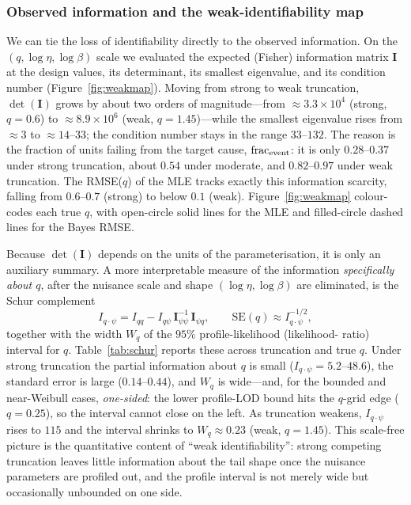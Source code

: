 \documentclass[ASNA,twocolumn]{USG}
\begin{document}
\subsubsection{Observed information and the weak-identifiability map}\label{sec:info}
We can tie the loss of identifiability directly to the observed
information. On the $(q,\log\eta,\log\beta)$ scale we evaluated the
expected (Fisher) information matrix $\bm I$ at the design values, its
determinant, its smallest eigenvalue, and its condition number
(Figure~\ref{fig:weakmap}). Moving from strong to weak truncation,
$\det(\bm I)$ grows by about two orders of magnitude---from
$\approx3.3\times10^{4}$ (strong, $q=0.6$) to $\approx8.9\times10^{6}$
(weak, $q=1.45$)---while the smallest eigenvalue rises from $\approx3$ to
$\approx14$--$33$; the condition number stays in the range
$33$--$132$. The reason is the fraction of units failing from the target
cause, $\mathrm{frac}_{\rm event}$: it is only $0.28$--$0.37$ under strong
truncation, about $0.54$ under moderate, and $0.82$--$0.97$ under weak
truncation. The RMSE($q$) of the MLE tracks exactly this information
scarcity, falling from $0.6$--$0.7$ (strong) to below $0.1$ (weak).
Figure~\ref{fig:weakmap} colour-codes each true $q$, with open-circle solid
lines for the MLE and filled-circle dashed lines for the Bayes RMSE.

Because $\det(\bm I)$ depends on the units of the parameterisation, it is
only an auxiliary summary. A more interpretable measure of the information
\emph{specifically about $q$}, after the nuisance scale and shape
$(\log\eta,\log\beta)$ are eliminated, is the Schur complement
{\abovedisplayskip=3.5pt\relax \abovedisplayshortskip=3.5pt\relax
\belowdisplayskip=3.5pt\relax \belowdisplayshortskip=3.5pt\relax
\begin{equation}\label{eq:schur}
I_{q\cdot\psi}=I_{qq}-I_{q\psi}\,\bm I_{\psi\psi}^{-1}\,\bm I_{\psi q},
\qquad
\mathrm{SE}(q)\approx I_{q\cdot\psi}^{-1/2},
\end{equation}}
together with the width $W_q$ of the $95\%$ profile-likelihood (likelihood-
ratio) interval for $q$. Table~\ref{tab:schur} reports these across
truncation and true $q$. Under strong truncation the partial information
about $q$ is small ($I_{q\cdot\psi}=5.2$--$48.6$), the standard error is
large ($0.14$--$0.44$), and $W_q$ is wide---and, for the bounded and
near-Weibull cases, \emph{one-sided}: the lower profile-LOD bound hits the
$q$-grid edge ($q=0.25$), so the interval cannot close on the left. As
truncation weakens, $I_{q\cdot\psi}$ rises to $115$ and the interval shrinks
to $W_q\approx0.23$ (weak, $q=1.45$). This scale-free picture is the
quantitative content of ``weak identifiability'': strong competing
truncation leaves little information about the tail shape once the nuisance
parameters are profiled out, and the profile interval is not merely wide but
occasionally unbounded on one side.
\end{document}
